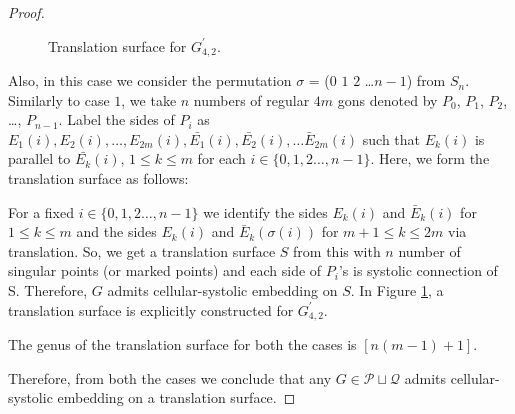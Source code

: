 \documentclass[11pt]{amsart}
\theoremstyle{plain}
\theoremstyle{definition}
\theoremstyle{remark}
\numberwithin{equation}{section}
\numberwithin{figure}{section}
\begin{document}
\begin{proof}
\begin{figure}[htbp]
\begin{center}
\caption{Translation surface for $G_{4,2}^\prime$.}
\label{figure17}
\end{center}
\end{figure}
Also, in this case we  consider the permutation $\sigma$ = ($0$ $1$ $2$ \dots $n-1$) from $S_n$. Similarly to case $1$, we take $n$ numbers of regular $4m$ gons denoted by $P_0$, $P_1$, $P_2$, \dots, $P_{n-1}$. Label the sides of $P_i$ as $E_1(i), E_2(i), \dots, E_{2m}(i), \bar{E_1}(i), \bar{E_2}(i), 
\dots \bar{E}_{2m}(i)$ such that $E_k(i)$ is parallel to $\bar{E_k}(i)$, $1\leq k\leq m$ for each $i\in \{0,1,2 \dots, n-1\}$. Here, we form the translation surface as follows:

For a fixed $i\in \{0,1,2 \dots, n-1\}$ we identify the sides $E_k(i)$ and $\bar{E}_k(i)$  for $1\le k\le m$ and the sides $E_k(i)$ and $\bar{E}_k(\sigma(i))$ for $m+1\le k\le 2m$ via translation. So, we get a translation surface $S$ from this with $n$ number of singular points (or marked points) and each side of $P_i$'s is systolic connection of S. Therefore, $G$ admits cellular-systolic embedding on $S$. In Figure \ref{figure17}, a translation surface is explicitly constructed for $G_{4,2}^\prime$. 

The genus of the translation surface for both the cases is $\left[n(m-1)+1\right]$.

Therefore, from both the cases we conclude that any $G\in \mathcal{P} \sqcup \mathcal{Q}$ admits cellular-systolic embedding on a translation surface.

\end{proof}



\end{document}
